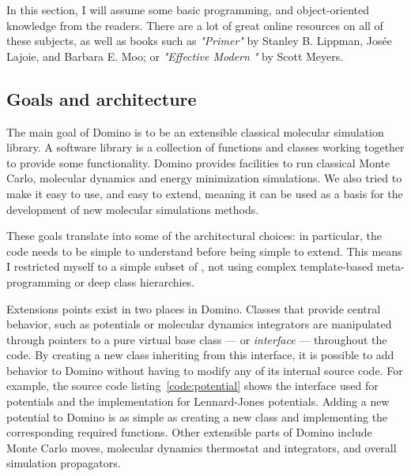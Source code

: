 \documentclass[thesis]{subfiles}
\begin{document}
In this section, I will assume some basic programming, \cxx and object-oriented
knowledge from the readers. There are a lot of great online resources on all of
these subjects, as well as books such as \emph{"\cxx Primer"} by Stanley B.
Lippman, Josée Lajoie, and Barbara E. Moo; or \emph{"Effective Modern \cxx"} by
Scott Meyers.

\subsection{Goals and architecture}

The main goal of Domino is to be an extensible classical molecular simulation
library. A software library is a collection of functions and classes working
together to provide some functionality. Domino provides facilities to run
classical Monte Carlo, molecular dynamics and energy minimization simulations.
We also tried to make it easy to use, and easy to extend, meaning it can be used
as a basis for the development of new molecular simulations methods.

These goals translate into some of the architectural choices: in particular, the
code needs to be simple to understand before being simple to extend. This means
I restricted myself to a simple subset of \cxx, not using complex template-based
meta-programming or deep class hierarchies.

Extensions points exist in two places in Domino. Classes that provide central
behavior, such as potentials or molecular dynamics integrators are manipulated
through pointers to a pure virtual base class --- or \emph{interface} ---
throughout the code. By creating a new class inheriting from this interface, it
is possible to add behavior to Domino without having to modify any of its
internal source code. For example, the source code listing~\ref{code:potential}
shows the interface used for potentials and the implementation for Lennard-Jones
potentials. Adding a new potential to Domino is as simple as creating a new
class and implementing the corresponding required functions. Other extensible
parts of Domino include Monte Carlo moves, molecular dynamics thermostat and
integrators, and overall simulation propagators.
\end{document}
